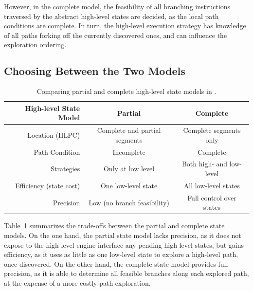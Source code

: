 However, in the complete model, the feasibility of all branching instructions traversed by the abstract high-level states are decided, as the local path conditions are complete.
%
In turn, the high-level execution strategy has knowledge of all paths forking off the currently discovered ones, and can influence the exploration ordering.

\subsection{Choosing Between the Two Models}

\newcommand{\goodcolor}{\cellcolor{LimeGreen}}
\newcommand{\badcolor}{\cellcolor{Lavender}}

\begin{table}
  \centering
  \small
  \begin{tabular}{r c c}
    High-level State Model & \textbf{Partial} & \textbf{Complete}               \\
    \hline
    \noalign{\smallskip}
    Location (HLPC) & Complete and partial segments & Complete segments only    \\
    Path Condition  & Incomplete                    & Complete                  \\
    Strategies      & Only at low level             & Both high- and low-level  \\
    \noalign{\smallskip}
    \hline
    \noalign{\smallskip}
    Efficiency (state cost) & \goodcolor One low-level state   & \badcolor All low-level states      \\
    Precision       & \badcolor Low (no branch feasibility)   & \goodcolor Full control over states  \\
  \end{tabular}
  \caption{Comparing partial and complete high-level state models in \chef.}
  \label{tab:chef:hl-states}
\end{table}

Table~\ref{tab:chef:hl-states} summarizes the trade-offs between the partial and complete state models.
%
On the one hand, the partial state model lacks precision, as it does not expose to the high-level engine interface any pending high-level states, but gains efficiency, as it uses as little as one low-level state to explore a high-level path, once discovered.
%
On the other hand, the complete state model provides full precision, as it is able to determine all feasible branches along each explored path, at the expense of a more costly path exploration.

